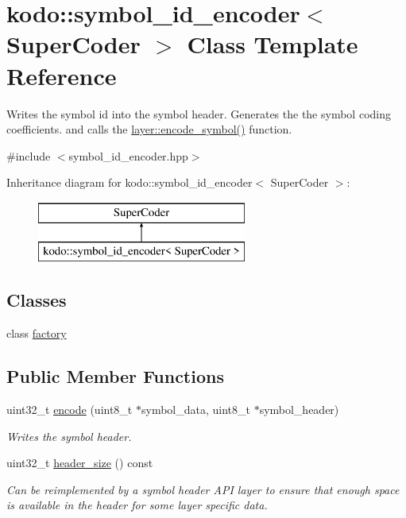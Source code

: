\hypertarget{classkodo_1_1symbol__id__encoder}{\section{kodo\-:\-:symbol\-\_\-id\-\_\-encoder$<$ Super\-Coder $>$ Class Template Reference}
\label{classkodo_1_1symbol__id__encoder}
}


Writes the symbol id into the symbol header. Generates the the symbol coding coefficients. and calls the \hyperlink{group__encoder__api_gaf28d3c1b82242263733ed082b1e10915}{layer\-::encode\-\_\-symbol()} function.  




{\ttfamily \#include $<$symbol\-\_\-id\-\_\-encoder.\-hpp$>$}

Inheritance diagram for kodo\-:\-:symbol\-\_\-id\-\_\-encoder$<$ Super\-Coder $>$\-:\begin{figure}[H]
\begin{center}
\leavevmode
\includegraphics[height=2.000000cm]{classkodo_1_1symbol__id__encoder}
\end{center}
\end{figure}
\subsection*{Classes}
\begin{DoxyCompactItemize}
\item 
class \hyperlink{classkodo_1_1symbol__id__encoder_1_1factory}{factory}
\end{DoxyCompactItemize}
\subsection*{Public Member Functions}
\begin{DoxyCompactItemize}
\item 
uint32\-\_\-t \hyperlink{classkodo_1_1symbol__id__encoder_a8df5b8e4ce87e1ea7d68fec0f3ebfb08}{encode} (uint8\-\_\-t $\ast$symbol\-\_\-data, uint8\-\_\-t $\ast$symbol\-\_\-header)
\begin{DoxyCompactList}\small\item\em Writes the symbol header. \end{DoxyCompactList}\item 
uint32\-\_\-t \hyperlink{classkodo_1_1symbol__id__encoder_a365d07655155198267ed45d66a514337}{header\-\_\-size} () const 
\begin{DoxyCompactList}\small\item\em Can be reimplemented by a symbol header A\-P\-I layer to ensure that enough space is available in the header for some layer specific data. \end{DoxyCompactList}\end{DoxyCompactItemize}


